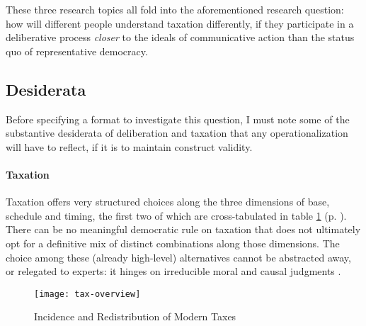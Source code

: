 
These three research topics all fold into the aforementioned research question: how will different people understand taxation differently, if they participate in a deliberative process \emph{closer} to the ideals of communicative action than the status quo of representative democracy.

\subsection{Desiderata}
Before specifying a format to investigate this question, I must note some of the substantive desiderata of deliberation and taxation that any operationalization will have to reflect, if it is to maintain construct validity.

\paragraph{Taxation}
Taxation offers very structured choices along the three dimensions of base, schedule and timing, the first two of which are cross-tabulated in table \ref{tab:tax-overview} (p. \pageref{tab:tax-overview}).
There can be no meaningful democratic rule on taxation that does not ultimately opt for a definitive mix of distinct combinations along those dimensions. 
The choice among these (already high-level) alternatives cannot be abstracted away, or relegated to experts: it hinges on irreducible moral and causal judgments \citep[for example, ][]{McCaffery2005}.

\begin{landscape}
 \begin{figure}[htbp]
    \begin{center}
	\texttt{[image: tax-overview]}  
	\caption{Incidence and Redistribution of Modern Taxes}
	\label{tab:tax-overview}
	\end{center}
	
\end{figure}
\end{landscape}

